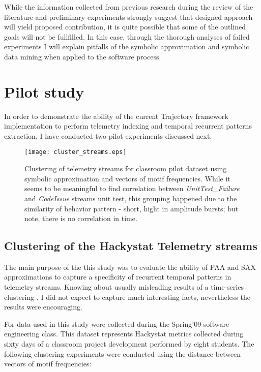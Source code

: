 While the information collected from previous research during the review of the literature and preliminary experiments strongly suggest that designed approach will yield proposed contribution, it is quite possible that some of the outlined goals will not be fullfilled. In this case, through the thorough analyses of failed experiments I will explain pitfalls of the symbolic approximation and symbolic data mining when applied to the software process.

\section{Pilot study}\label{pilot.evaluation}
In order to demonstrate the ability of the current Trajectory framework implementation to perform telemetry indexing and temporal recurrent patterns extraction, I have conducted two pilot experiments discussed next. 

\begin{figure}[tbp]
   \centering
   \texttt{[image: cluster\_streams.eps]}
   \caption{Clustering of telemetry streams for classroom pilot dataset using symbolic approximation and vectors of motif frequencies. While it seems to be meaningful to find correlation between \textit{UnitTest\_Failure} and \textit{CodeIssue} streams unit test, this grouping happened due to the similarity of behavior pattern - short, hight in amplitude bursts; but note, there is no correlation in time.}
   \label{fig:cluster_streams}
\end{figure}

\subsection{Clustering of the Hackystat Telemetry streams}
The main purpose of the this study was to evaluate the ability of PAA and SAX approximations to capture a specificity of recurrent temporal patterns in telemetry streams. Knowing about usually misleading results of a time-series clustering \cite{citeulike:227029}, I did not expect to capture much interesting facts, nevertheless the results were encouraging.

For data used in this study were collected during the Spring'09 software engineering class. This dataset represents Hackystat metrics collected during sixty days of a classroom project development performed by eight students. The following clustering experiments were conducted using the distance between vectors of motif frequencies:

